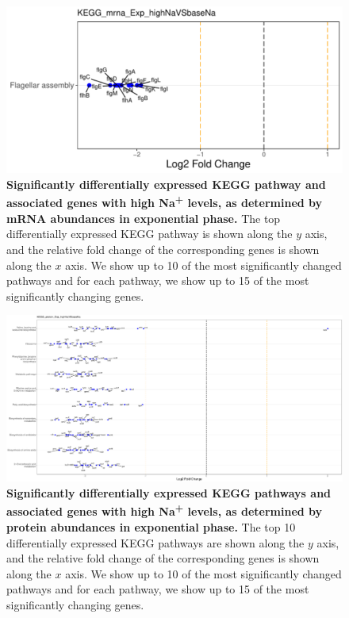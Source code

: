 \documentclass[a4paper]{article}
\begin{document}
\clearpage
\begin{figure}
	\includegraphics[width=1.0\textwidth]{../../d_figures/KEGG13_mrna_Exp_highNaVSbaseNa_withTitle.pdf}
	\caption[Significantly differentially expressed KEGG pathway for mRNA samples in exponential phase tested for high Na\textsuperscript{+} against base Na\textsuperscript{+}]
	{\textbf{Significantly differentially expressed KEGG pathway and associated genes with high Na\textsuperscript{+} levels, as determined by mRNA abundances in exponential phase.} The top differentially expressed KEGG pathway is shown along the $y$ axis, and the relative fold change of the corresponding genes is shown along the $x$ axis. We show up to 10 of the most significantly changed pathways and for each pathway, we show up to 15 of the most significantly changing genes.}
\end{figure}

\clearpage
\begin{figure}
	\includegraphics[width=1.0\textwidth]{../../d_figures/KEGG14_protein_Exp_highNaVSbaseNa_withTitle.pdf}
	\caption[Significantly differentially expressed KEGG pathways for protein samples in exponential phase tested for high Na\textsuperscript{+} against base Na\textsuperscript{+}]
	{\textbf{Significantly differentially expressed KEGG pathways and associated genes with high Na\textsuperscript{+} levels, as determined by protein abundances in exponential phase.} The top 10 differentially expressed KEGG pathways are shown along the $y$ axis, and the relative fold change of the corresponding genes is shown along the $x$ axis. We show up to 10 of the most significantly changed pathways and for each pathway, we show up to 15 of the most significantly changing genes.}
\end{figure}
\end{document}

